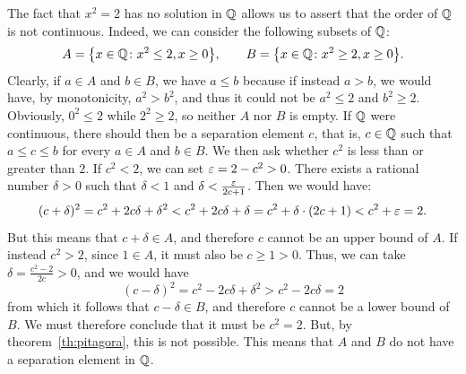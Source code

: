 The fact that $x^2=2$ has no solution in ${\mathbb Q}$ allows us to assert that the
order of ${\mathbb Q}$ is not continuous. Indeed, we can consider the following subsets
of ${\mathbb Q}$:
\[
 A = {\left\{ x\in {\mathbb Q}\colon x^2\le 2, x\ge 0 \right\}}, \qquad
 B = {\left\{ x\in {\mathbb Q}\colon x^2\ge 2, x\ge 0 \right\}}. 
\]
Clearly, if $a\in A$ and $b\in B$, we have $a\le b$ because if instead $a>b$, we
would have, by monotonicity, $a^2>b^2$, and thus it could not be $a^2 \le 2$ and
$b^2\ge 2$. Obviously, $0^2 \le 2$ while $2^2\ge 2$, so neither $A$ nor $B$ is
empty. If ${\mathbb Q}$ were continuous, there should then be a separation element $c$,
that is, $c\in {\mathbb Q}$ such that $a\le c\le b$ for every $a\in A$ and $b\in B$. We
then ask whether $c^2$ is less than or greater than $2$. If $c^2<2$, we can set
$\varepsilon = 2-c^2 > 0$. There exists a rational number $\delta>0$ such that
$\delta<1$ and $\delta < \frac{\varepsilon}{2c+1}$. Then we would have:
\[
 (c+\delta)^2 
  = c^2+2c\delta + \delta^2 
  < c^2 + 2c\delta + \delta 
  = c^2 + \delta\cdot(2c+1) 
  < c^2 + \varepsilon = 2.
\]
But this means that $c+\delta \in A$, and therefore $c$ cannot be an upper bound
of $A$. If instead $c^2>2$, since $1\in A$, it must also be $c\ge 1>0$. Thus, we
can take $\delta = \frac{c^2-2}{2c}>0$, and we would have
\[
 (c-\delta)^2 
 = c^2 - 2c\delta + \delta^2
 > c^2 - 2c\delta = 2
\]
from which it follows that $c-\delta \in B$, and therefore $c$ cannot be a lower
bound of $B$. We must therefore conclude that it must be $c^2=2$. But, by
theorem~\ref{th:pitagora}, this is not possible. This means that $A$ and $B$ do
not have a separation element in ${\mathbb Q}$.